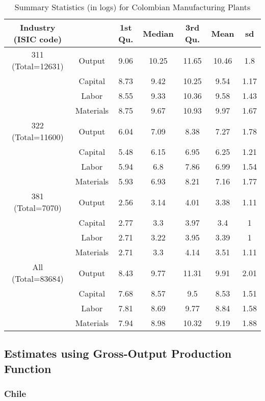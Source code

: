\documentclass[11pt]{article}
\begin{document}
\begin{table}[H]
\centering
\caption{Summary Statistics (in logs) for Colombian Manufacturing Plants}
\begin{tabular}{ccccccc}
  \hline\hline Industry (ISIC code) &   & 1st Qu. & Median & 3rd Qu. & Mean & sd \\ 
  \hline
311 (Total=12631) & Output & 9.06 & 10.25 & 11.65 & 10.46 & 1.8 \\ 
   & Capital & 8.73 & 9.42 & 10.25 & 9.54 & 1.17 \\ 
   & Labor & 8.55 & 9.33 & 10.36 & 9.58 & 1.43 \\ 
   & Materials & 8.75 & 9.67 & 10.93 & 9.97 & 1.67 \\ 
  322 (Total=11600) & Output & 6.04 & 7.09 & 8.38 & 7.27 & 1.78 \\ 
   & Capital & 5.48 & 6.15 & 6.95 & 6.25 & 1.21 \\ 
   & Labor & 5.94 & 6.8 & 7.86 & 6.99 & 1.54 \\ 
   & Materials & 5.93 & 6.93 & 8.21 & 7.16 & 1.77 \\ 
  381 (Total=7070) & Output & 2.56 & 3.14 & 4.01 & 3.38 & 1.11 \\ 
   & Capital & 2.77 & 3.3 & 3.97 & 3.4 & 1 \\ 
   & Labor & 2.71 & 3.22 & 3.95 & 3.39 & 1 \\ 
   & Materials & 2.71 & 3.3 & 4.14 & 3.51 & 1.11 \\ 
  All (Total=83684) & Output & 8.43 & 9.77 & 11.31 & 9.91 & 2.01 \\ 
   & Capital & 7.68 & 8.57 & 9.5 & 8.53 & 1.51 \\ 
   & Labor & 7.81 & 8.69 & 9.77 & 8.84 & 1.58 \\ 
   & Materials & 7.94 & 8.98 & 10.32 & 9.19 & 1.88 \\ 
   \hline
\end{tabular}
\label{COLsum}
\end{table}

\subsection{Estimates using Gross-Output Production Function}

\subsubsection{Chile}
\end{document}
